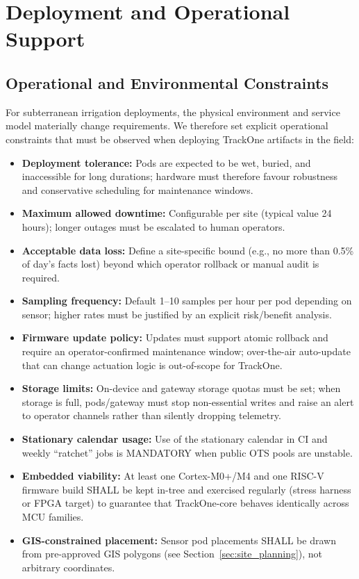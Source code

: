 \section{Deployment and Operational Support}
\label{sec:deployment-support}

\subsection{Operational and Environmental Constraints}\label{subsec:operational-and-environmental-constraints}
For subterranean irrigation deployments, the physical environment and service model materially change requirements.
We therefore set explicit operational constraints that must be observed when deploying TrackOne artifacts in the field:
\begin{itemize}[nosep]
  \item \textbf{Deployment tolerance:} Pods are expected to be wet, buried, and inaccessible for long durations; hardware must therefore favour robustness and conservative scheduling for maintenance windows.
  \item \textbf{Maximum allowed downtime:} Configurable per site (typical value 24 hours); longer outages must be escalated to human operators.
  \item \textbf{Acceptable data loss:} Define a site-specific bound (e.g., no more than 0.5\% of day's facts lost) beyond which operator rollback or manual audit is required.
  \item \textbf{Sampling frequency:} Default 1--10 samples per hour per pod depending on sensor; higher rates must be justified by an explicit risk/benefit analysis.
  \item \textbf{Firmware update policy:} Updates must support atomic rollback and require an operator-confirmed maintenance window; over-the-air auto-update that can change actuation logic is out-of-scope for TrackOne.
  \item \textbf{Storage limits:} On-device and gateway storage quotas must be set; when storage is full, pods/gateway must stop non-essential writes and raise an alert to operator channels rather than silently dropping telemetry.
  \item \textbf{Stationary calendar usage:} Use of the stationary calendar in \ac{CI} and weekly ``ratchet'' jobs is MANDATORY when public \ac{OTS} pools are unstable.
  \item \textbf{Embedded viability:} At least one Cortex-M0+/M4 and one RISC-V firmware build \ac{SHA}LL be kept
  in-tree and exercised regularly (stress harness or FPGA target) to guarantee that TrackOne-core behaves identically
  across \ac{MCU} families.
  \item \textbf{GIS-constrained placement:} Sensor pod placements \ac{SHA}LL be drawn from pre-approved \ac{GIS} polygons (see Section~\ref{sec:site_planning}), not arbitrary coordinates.
\end{itemize}

